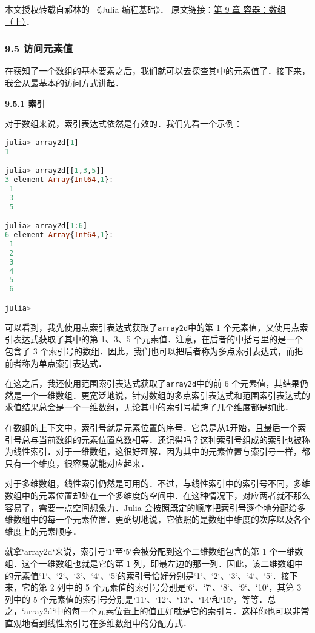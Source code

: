
本文授权转载自郝林的 《Julia 编程基础》． 原文链接：\href{https://github.com/hyper0x/JuliaBasics/blob/master/book/ch09.md}{第 9 章 容器：数组（上）}．


\subsubsection{9.5 访问元素值}

在获知了一个数组的基本要素之后，我们就可以去探查其中的元素值了．接下来，我会从最基本的访问方式讲起．

\textbf{9.5.1 索引}

对于数组来说，索引表达式依然是有效的．我们先看一个示例：

\begin{lstlisting}[language=julia]
julia> array2d[1]
1

julia> array2d[[1,3,5]]
3-element Array{Int64,1}:
 1
 3
 5

julia> array2d[1:6]
6-element Array{Int64,1}:
 1
 2
 3
 4
 5
 6

julia> 
\end{lstlisting}

可以看到，我先使用点索引表达式获取了\verb|array2d|中的第 1 个元素值，又使用点索引表达式获取了其中的第 1、3、5 个元素值．注意，在后者的中括号里的是一个包含了 3 个索引号的数组．因此，我们也可以把后者称为多点索引表达式，而把前者称为单点索引表达式．

在这之后，我还使用范围索引表达式获取了\verb|array2d|中的前 6 个元素值，其结果仍然是一个一维数组．更宽泛地说，针对数组的多点索引表达式和范围索引表达式的求值结果总会是一个一维数组，无论其中的索引号横跨了几个维度都是如此．

在数组的上下文中，索引号就是元素位置的序号．它总是从\verb|1|开始，且最后一个索引号总与当前数组的元素位置总数相等．还记得吗？这种索引号组成的索引也被称为线性索引．对于一维数组，这很好理解．因为其中的元素位置与索引号一样，都只有一个维度，很容易就能对应起来．

对于多维数组，线性索引仍然是可用的．不过，与线性索引中的索引号不同，多维数组中的元素位置却处在一个多维度的空间中．在这种情况下，对应两者就不那么容易了，需要一点空间想象力．Julia 会按照既定的顺序把索引号逐个地分配给多维数组中的每一个元素位置．更确切地说，它依照的是数组中维度的次序以及各个维度上的元素顺序．

就拿`array2d`来说，索引号`1`至`5`会被分配到这个二维数组包含的第 1 个一维数组．这个一维数组也就是它的第 1 列，即最左边的那一列．因此，该二维数组中的元素值`1`、`2`、`3`、`4`、`5`的索引号恰好分别是`1`、`2`、`3`、`4`、`5`．接下来，它的第 2 列中的 5 个元素值的索引号分别是`6`、`7`、`8`、`9`、`10`，其第 3 列中的 5 个元素值的索引号分别是`11`、`12`、`13`、`14`和`15`，等等．总之，`array2d`中的每一个元素位置上的值正好就是它的索引号．这样你也可以非常直观地看到线性索引号在多维数组中的分配方式．

